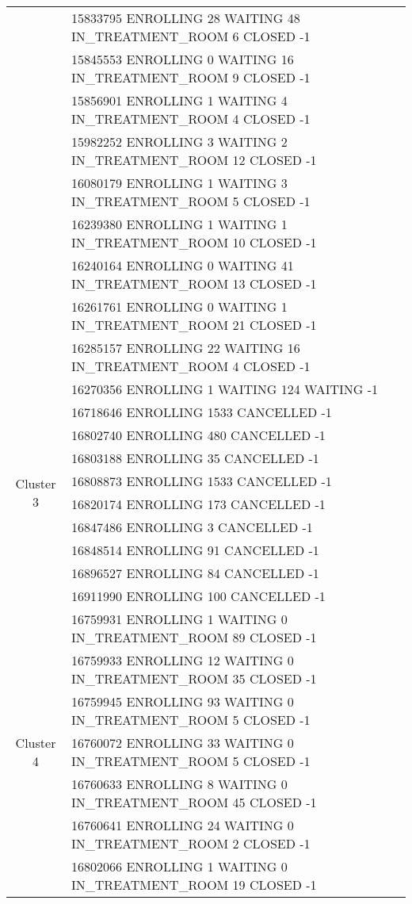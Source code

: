 {\begin{longtable}{|c|p{}|}
		& 15833795 ENROLLING 28 WAITING 48 IN\_TREATMENT\_ROOM 6 CLOSED -1 \\
		& 15845553 ENROLLING 0 WAITING 16 IN\_TREATMENT\_ROOM 9 CLOSED -1 \\
		& 15856901 ENROLLING 1 WAITING 4 IN\_TREATMENT\_ROOM 4 CLOSED -1 \\
		& 15982252 ENROLLING 3 WAITING 2 IN\_TREATMENT\_ROOM 12 CLOSED -1 \\
		& 16080179 ENROLLING 1 WAITING 3 IN\_TREATMENT\_ROOM 5 CLOSED -1 \\
		& 16239380 ENROLLING 1 WAITING 1 IN\_TREATMENT\_ROOM 10 CLOSED -1 \\
		& 16240164 ENROLLING 0 WAITING 41 IN\_TREATMENT\_ROOM 13 CLOSED -1 \\
		& 16261761 ENROLLING 0 WAITING 1 IN\_TREATMENT\_ROOM 21 CLOSED -1 \\
		& 16285157 ENROLLING 22 WAITING 16 IN\_TREATMENT\_ROOM 4 CLOSED -1 \\
		\hline
		\multirow{10}{*}{Cluster 3}
		& 16270356 ENROLLING 1 WAITING 124 WAITING -1 \\
		& 16718646 ENROLLING 1533 CANCELLED -1 \\
		& 16802740 ENROLLING 480 CANCELLED -1 \\
		& 16803188 ENROLLING 35 CANCELLED -1 \\
		& 16808873 ENROLLING 1533 CANCELLED -1 \\
		& 16820174 ENROLLING 173 CANCELLED -1 \\
		& 16847486 ENROLLING 3 CANCELLED -1 \\
		& 16848514 ENROLLING 91 CANCELLED -1 \\
		& 16896527 ENROLLING 84 CANCELLED -1 \\
		& 16911990 ENROLLING 100 CANCELLED -1 \\
		\hline
		\multirow{10}{*}{Cluster 4}
		& 16759931 ENROLLING 1 WAITING 0 IN\_TREATMENT\_ROOM 89 CLOSED -1 \\
		& 16759933 ENROLLING 12 WAITING 0 IN\_TREATMENT\_ROOM 35 CLOSED -1 \\
		& 16759945 ENROLLING 93 WAITING 0 IN\_TREATMENT\_ROOM 5 CLOSED -1 \\
		& 16760072 ENROLLING 33 WAITING 0 IN\_TREATMENT\_ROOM 5 CLOSED -1 \\
		& 16760633 ENROLLING 8 WAITING 0 IN\_TREATMENT\_ROOM 45 CLOSED -1 \\
		& 16760641 ENROLLING 24 WAITING 0 IN\_TREATMENT\_ROOM 2 CLOSED -1 \\
		& 16802066 ENROLLING 1 WAITING 0 IN\_TREATMENT\_ROOM 19 CLOSED -1 \\

\end{longtable}}
